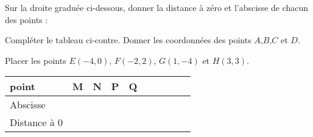 \documentclass[a4paper,addpoints,12pt]{exam}
\begin{document}
\devoir[sem=2,prv=false,ds=true,num=6 ,niv=1 ]



\begin{exo}[14]
Sur la droite graduée ci-dessous, donner la distance à zéro et l’abscisse de chacun des points   :

\vspace{5mm}

\begin{minipage}{.6\linewidth}
\begin{questions}
\question Compléter le tableau ci-contre.
\question Donner les coordonnées des points $A$,$B$,$C$ et $D$.

\anserline[2]
\question Placer les points $E(-4, 0)$, $F(-2, 2)$, $G(1, -4)$ et $H(3, 3)$.
\end{questions}
\end{minipage}
\begin{minipage}{.4\linewidth}
\begin{tabular}{|*5{Oc|}}
\hline 
point & M & N & P & Q \\ 
\hline 
Abscisse &  &  &  &  \\ 
\hline 
Distance à 0 &  &  &  &  \\ 
\hline 
\end{tabular} 
\end{minipage}

\begin{reper}
\tkzSetUpPoint[shape=cross out,size=5]
\end{reper}
\end{exo}
\end{document}
